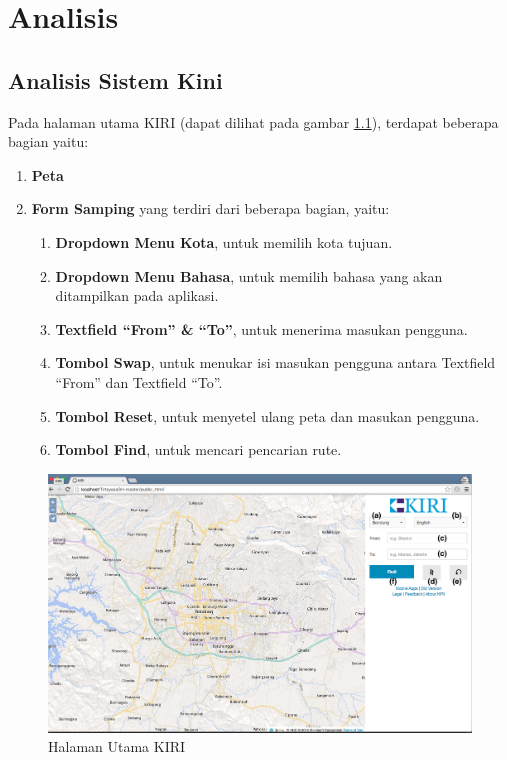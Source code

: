 \chapter{Analisis}
\label{chap:analisis}

\section{Analisis Sistem Kini}
\label{sec:analisiskini}
Pada halaman utama KIRI (dapat dilihat pada gambar \ref{fig:3_KIRI_main}), terdapat beberapa bagian yaitu:

\begin{enumerate}
    		\item \textbf{Peta}
    		\item \textbf{Form Samping} yang terdiri dari beberapa bagian, yaitu:
    		\begin{enumerate}
    			\item \textbf{Dropdown Menu Kota}, untuk memilih kota tujuan.
    			\item \textbf{Dropdown Menu Bahasa}, untuk memilih bahasa yang akan ditampilkan pada aplikasi.
    			\item \textbf{Textfield ``From'' \& ``To''}, untuk menerima masukan pengguna.
    			\item \textbf{Tombol Swap}, untuk menukar isi masukan pengguna antara Textfield ``From'' dan Textfield ``To''.
    			\item \textbf{Tombol Reset}, untuk menyetel ulang peta dan masukan pengguna.
    			\item \textbf{Tombol Find}, untuk mencari pencarian rute.
    		\end{enumerate}
\end{enumerate}

\begin{figure}[H]
	\centering
	\includegraphics[scale=0.3]{Gambar/KIRI-main}
	\caption{Halaman Utama KIRI} 
	\label{fig:3_KIRI_main}
\end{figure}

